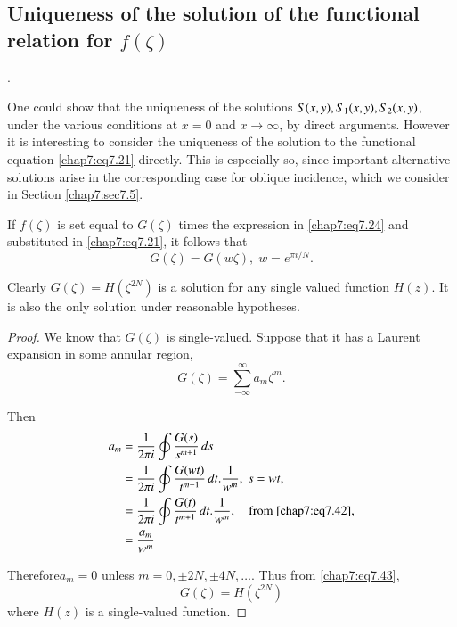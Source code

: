 {{\subsection*{\bf Uniqueness of the solution of the functional relation for $f(\zeta)$}.\pageoriginale

One could show that the uniqueness of the solutions $S(x,y),\break S_1(x,y),
S_2(x,y)$, under the various conditions at $x=0$ and $x\to\infty$, by
direct arguments. However it is interesting to consider the uniqueness
of the solution to the functional equation \eqref{chap7:eq7.21}
directly. This is especially so, since important alternative solutions
arise in the corresponding case for oblique incidence, which we
consider in Section \ref{chap7:sec7.5}. 

If $f(\zeta)$ is set equal to $G(\zeta)$ times the expression in \eqref{chap7:eq7.24} and substituted in \eqref{chap7:eq7.21}, it follows that 
\begin{equation}
G(\zeta)=G(w\zeta),\;w=e^{\pi i/N}.\tag{7.42}\label{chap7:eq7.42}
\end{equation}

Clearly $G(\zeta)=H(\zeta^{2N})$ is a solution for any single valued function $H(z)$. It is also the only solution under reasonable hypotheses.
\begin{proof}
We know that $G(\zeta)$ is single-valued. Suppose that it has a Laurent expansion in some annular region, \ie
\begin{equation}
G(\zeta)=\sum\limits_{-\infty}^\infty a_m\zeta^m.\tag{7.43}\label{chap7:eq7.43}
\end{equation}

Then
\begin{align*}
a_m &= \frac{1}{2\pi i}\oint \frac{G(s)}{s^{m+1}}\,ds\\
&=\frac{1}{2\pi i}\oint\frac{G(wt)}{t^{m+1}}\,dt.\frac{1}{w^m},\;s=wt,\\
&=\frac{1}{2\pi i}\oint\frac{G(t)}{t^{m+1}}\,dt.\frac{1}{w^m},\quad\text{from \eqref{chap7:eq7.42}},\\
&=\frac{a_m}{w^m}
\end{align*}

Therefore\pageoriginale $a_m=0$ unless $m=0,\pm 2N, \pm 4N,\ldots$. Thus from \eqref{chap7:eq7.43}, 
$$
G(\zeta)=H\left(\zeta^{2N}\right)
$$
where $H(z)$ is a single-valued function.


\end{proof}}}
